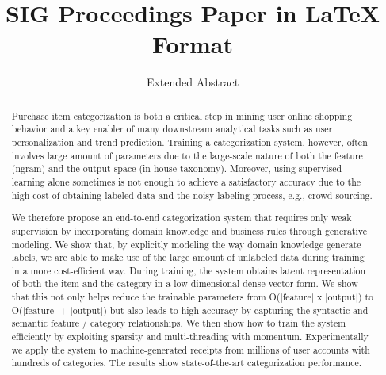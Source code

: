 \documentclass[sigconf]{acmart}
\begin{document}
\title{SIG Proceedings Paper in LaTeX Format}
\subtitle{Extended Abstract}


\renewcommand{\shortauthors}{B. Trovato et al.}


\begin{abstract}
Purchase item categorization is both a critical step in mining user online shopping behavior and a key enabler of 
many downstream analytical tasks such as user personalization and trend prediction.
Training a categorization system, however, often involves large amount of parameters due to the large-scale nature of both the feature (ngram) and the output space (in-house taxonomy). 
Moreover, using supervised learning alone sometimes is not enough to achieve a satisfactory accuracy due to the high cost of obtaining labeled data and the noisy labeling process, e.g., crowd sourcing.   

We therefore propose an end-to-end categorization system that requires only weak supervision by incorporating domain knowledge and business rules through generative modeling. We show that, by explicitly modeling the way domain knowledge generate labels, we are able to make use of the large amount of unlabeled data during training in a more cost-efficient way. 
During training, the system obtains latent representation of both the item and the category in a low-dimensional dense vector form. We show that this not only helps reduce the trainable parameters from O(|feature| x |output|) to O(|feature| + |output|) but also leads to high accuracy by capturing the syntactic and semantic feature / category relationships. We then show how to train the system efficiently by exploiting sparsity and multi-threading with momentum.
Experimentally we apply the system to machine-generated receipts from millions of user accounts with hundreds of categories. The results show state-of-the-art categorization performance.
\end{abstract}

%
%
\end{document}
